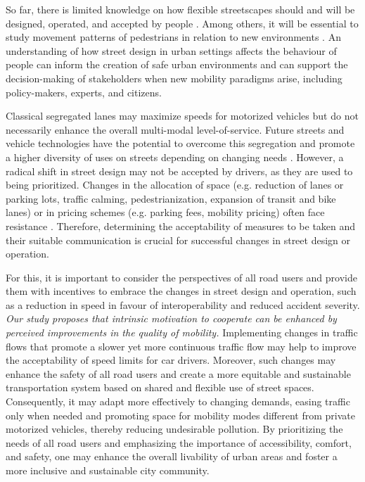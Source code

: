 So far, there is limited knowledge on how flexible streetscapes should and will be designed, operated, and accepted by people \cite{Ruiz-Apilanez2017}. Among others, it will be essential to study movement patterns of pedestrians in relation to new environments \cite{Zacharias2001pedestrian}. An understanding of how street design in urban settings affects the behaviour of people can inform the creation of safe urban environments and can support the decision-making of stakeholders when new mobility paradigms arise, including policy-makers, experts, and citizens.

Classical segregated lanes may maximize speeds for motorized vehicles but do not necessarily enhance the overall multi-modal level-of-service. Future streets and vehicle technologies have the potential to overcome this segregation and promote a higher diversity of uses on streets depending on changing needs \cite{Duarte2018, Ruiz-Apilanez2017}. However, a radical shift in street design may not be accepted by drivers, as they are used to being prioritized. Changes in the allocation of space (e.g. reduction of lanes or parking lots, traffic calming, pedestrianization, expansion of transit and bike lanes) or in pricing schemes (e.g. parking fees, mobility pricing) often face resistance \cite{GoesslingJUrbanDesign2020}. Therefore, determining the acceptability of measures to be taken and their suitable communication is crucial for successful changes in street design or operation. 

For this, it is important to consider the perspectives of all road users and provide them with incentives to embrace the changes in street design and operation, such as a reduction in speed in favour of interoperability and reduced accident severity. 
\emph{Our study proposes that intrinsic motivation to cooperate can be enhanced by perceived improvements in the quality of mobility.} 
Implementing changes in traffic flows that promote a slower yet more continuous traffic flow may help to improve the acceptability of speed limits for car drivers. Moreover, such changes may enhance the safety of all road users and create a more equitable and sustainable transportation system based on shared and flexible use of street spaces. Consequently, it may adapt more effectively to changing demands, easing traffic only when needed and promoting space for mobility modes different from private motorized vehicles, thereby reducing undesirable pollution.
By prioritizing the needs of all road users and emphasizing the importance of accessibility, comfort, and safety, one may enhance the overall livability of urban areas and foster a more inclusive and sustainable city community.

